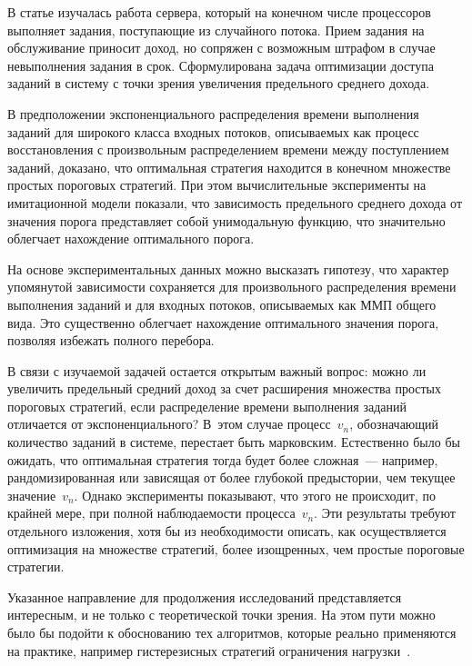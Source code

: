 \begin{multicols}{2}
  В статье изучалась работа сервера, который на конечном числе процессоров выполняет 
задания, поступающие из случайного потока. Прием задания на обслуживание приносит 
доход, но сопряжен с возможным штрафом в случае невыполнения задания в срок. 
Сформулирована задача оптимизации доступа заданий в систему с точки зрения 
увеличения предельного среднего дохода.
  
  В предположении экспоненциального распределения времени выполнения заданий для 
широкого класса входных потоков, описываемых как процесс восстановления с 
произвольным распределением времени между поступлением заданий, доказано, что 
оптимальная стратегия находится в конечном множестве простых пороговых стратегий. 
При этом вычислительные эксперименты на имитационной модели показали, что 
зависимость предельного среднего дохода от значения порога представляет собой 
унимодальную функцию, что значительно облегчает нахождение оптимального порога.
  
  На основе экспериментальных данных можно высказать гипотезу, что характер 
упомянутой зависимости сохраняется для произвольного распределения времени 
выполнения заданий и для входных потоков, описываемых как 
ММП общего вида. Это существенно облегчает нахождение оптимального значения 
порога, позволяя избежать полного перебора.
  
  В связи с изучаемой задачей остается открытым важный вопрос: можно ли увеличить 
предельный средний доход за счет расширения множества простых пороговых стратегий, 
если распределение времени выполнения заданий отличается от экспоненциального? 
В~этом случае процесс~$v_n$, обозначающий количество заданий в системе, перестает 
быть марковским. Естественно было бы ожидать, что оптимальная стратегия тогда будет 
более сложная~--- например, рандомизированная или зависящая от более глубокой 
предыстории, чем текущее значение~$v_n$. Однако эксперименты показывают, что этого 
не происходит, по крайней мере, при полной наблюдаемости процесса~$v_n$. Эти 
результаты требуют отдельного изложения, хотя бы из необходимости описать, как 
осуществляется оптимизация на множестве стратегий, более изощренных, чем простые 
пороговые стратегии.
  
  Указанное направление для продолжения исследований представляется интересным, и 
не только с теоретической точки зрения. На этом пути можно было бы подойти к 
обоснованию тех алгоритмов, которые реально применяются на практике, например 
гистерезисных стратегий ограничения нагрузки~\cite{8-kon}.


\end{multicols}
